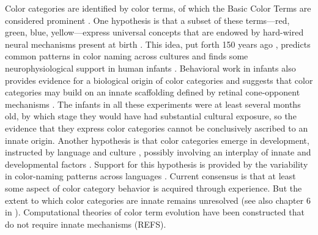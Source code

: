 \documentclass[9pt,biorxiv,lineno,onehalfspacing]{lapreprint}
\begin{document}
\begin{refsection}
Color categories are identified by color terms, of which the Basic Color Terms are considered prominent \citep{berlin_basic_1969}.
One hypothesis is that a subset of these terms---red, green, blue, yellow---express universal concepts \citep{heider_universals_1972,regier_focal_2005}
that are endowed by hard-wired neural mechanisms present at birth \citep{bornstein_categories_1976,lindsey_universality_2006}. 
This idea, put forth 150 years ago \citep{hering_zur_1875}, predicts common patterns in color naming across cultures \citep{baronchelli_modeling_2010,lindsey_hunter-gatherer_2015,abbott_focal_2016}
and finds some neurophysiological support in human infants \citep{clifford_electrophysiological_2009,yang_cortical_2016}. 
Behavioral work in infants also provides evidence for a biological origin of color categories \citep{franklin_new_2004,ozturk_language_2013} and suggests that color categories may build on an innate scaffolding defined by retinal cone-opponent mechanisms \citep{skelton_biological_2017}. 
The infants in all these experiments were at least several months old, by which stage they would have had substantial cultural exposure, so the evidence that they express color categories cannot be conclusively ascribed to an innate origin. 
Another hypothesis is that color categories emerge in development, instructed by language and culture \citep{davidoff_colour_1999,roberson_color_2005}, possibly involving an interplay of innate and developmental factors \citep{webster_variations_2002,kay_language_2006,franklin_lateralization_2008,regier_language_2009,paramei_online_2018}. 
Support for this hypothesis is provided by the variability in color-naming patterns across languages \citep{davidoff_colour_1999,webster_variations_2002,roberson_color_2005,kay_language_2006,gibson_color_2017, paramei_online_2018}. 
Current consensus is that at least some aspect of color category behavior is acquired through experience. But the extent to which color categories are innate remains unresolved \citep{davidoff_nature_2009,RN18696,RN18699}(see also chapter 6 in \citep{block_border_2023}). Computational theories of color term evolution have been constructed that do not require innate mechanisms (REFS). 


\end{refsection}
\end{document}
